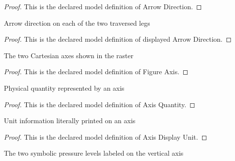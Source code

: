 \begin{proof}
  This is the declared model definition of Arrow Direction.
\end{proof}
\begin{definition}
  \label{def:physics:phyx-mini-0491:phyxminiproblems-problemphyxmini0491-displayedarrowdirection}
  Arrow direction on each of the two traversed legs
\end{definition}
\begin{proof}
  This is the declared model definition of displayed Arrow Direction.
\end{proof}
\begin{definition}
  \label{def:physics:phyx-mini-0491:phyxminiproblems-problemphyxmini0491-figureaxis}
  The two Cartesian axes shown in the raster
\end{definition}
\begin{proof}
  This is the declared model definition of Figure Axis.
\end{proof}
\begin{definition}
  \label{def:physics:phyx-mini-0491:phyxminiproblems-problemphyxmini0491-axisquantity}
  Physical quantity represented by an axis
\end{definition}
\begin{proof}
  This is the declared model definition of Axis Quantity.
\end{proof}
\begin{definition}
  \label{def:physics:phyx-mini-0491:phyxminiproblems-problemphyxmini0491-axisdisplayunit}
  Unit information literally printed on an axis
\end{definition}
\begin{proof}
  This is the declared model definition of Axis Display Unit.
\end{proof}
\begin{definition}
  \label{def:physics:phyx-mini-0491:phyxminiproblems-problemphyxmini0491-pressurelevellabel}
  The two symbolic pressure levels labeled on the vertical axis
\end{definition}

